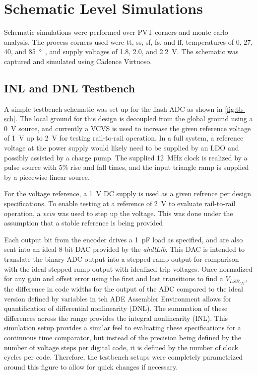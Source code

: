 \documentclass[11pt,letterpaper]{article}
\begin{document}
\section{Schematic Level Simulations}

Schematic simulations were performed over PVT corners and monte carlo analysis. The process corners used were tt, ss, sf, fs, and ff, temperatures of 0, 27, 40, and \qty{85}{\degree\C}, and supply voltages of 1.8, 2.0, and \qty{2.2}{\V}. The schematic was captured and simulated using C\=adence Virtuoso. 

\subsection{INL and DNL Testbench}

A simple testbench schematic was set up for the flash ADC as shown in \cref{fig:tb-sch}. The local ground for this design is decoupled from the global ground using a \qty{0}{\V} source, and currently a VCVS is used to increase the given reference voltage of \qty{1}{\V} up to \qty{2}{\V} for testing rail-to-rail operation. In a full system, a reference voltage at the power supply would likely need to be supplied by an LDO and possibly assisted by a charge pump. The supplied \qty{12}{\MHz} clock is realized by a pulse source with 5\% rise and fall times, and the input triangle ramp is supplied by a piecewise-linear source. 

For the voltage reference, a \qty{1}{\V} DC supply is used as a given refrence per design specifications. To enable testing at a reference of \qty{2}{\V} to evaluate rail-to-rail operation, a \emph{vcvs} was used to step up the voltage. This was done under the assumption that a stable reference is being provided 

Each output bit from the encoder drives a \qty{1}{\pF} load as specified, and are also sent into an ideal 8-bit DAC provided by the \emph{ahdlLib}. This DAC is intended to translate the binary ADC output into a stepped ramp output for comparison with the ideal stepped ramp output with idealized trip voltages. Once normalized for any gain and offset error using the first and last transitions to find a \(V_{LSB_{eff}}\), the difference in code widths for the output of the ADC compared to the ideal version defined by variables in teh ADE Assembler Environment allows for quantification of differential nonlinearity (DNL). The summation of these differences across the range provides the integral nonlinearity (INL). This simulation setup provides a similar feel to evaluating these specifications for a continuous time comparator, but instead of the precision being defined by the number of voltage steps per digital code, it is defined by the number of clock cycles per code. Therefore, the testbench setups were completely parametrized around this figure to allow for quick changes if necessary.
\end{document}
